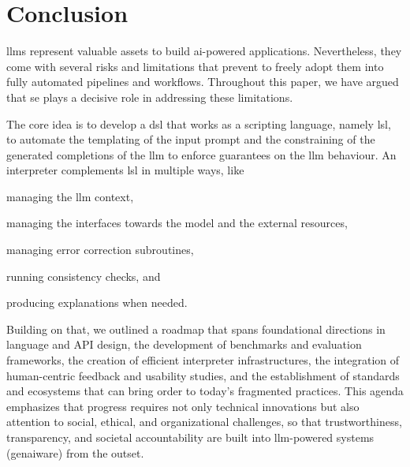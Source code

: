 \documentclass[manuscript,screen]{acmart}
\begin{document}
\section{Conclusion}
\label{sec:conclusion}

\acp{llm} represent valuable assets to build \ac{ai}-powered applications.
Nevertheless, they come with several risks and limitations that prevent to freely adopt them into fully automated pipelines and workflows.
Throughout this paper, we have argued that \ac{se} plays a decisive role in addressing these limitations.



The core idea is to develop a \ac{dsl} that works as a scripting language, namely \ac{lsl}, to automate the templating of the input prompt and the constraining of the generated completions of the \ac{llm} to enforce guarantees on the \ac{llm} behaviour.
An interpreter complements \ac{lsl} in multiple ways, like
\begin{enumerate*}
    \item managing the \ac{llm} context,
    \item managing the interfaces towards the model and the external resources,
    \item managing error correction subroutines,
    \item running consistency checks, and
    \item producing explanations when needed.
\end{enumerate*}

Building on that, we outlined a roadmap that spans foundational directions in language and API design, the development of benchmarks and evaluation frameworks, the creation of efficient interpreter infrastructures, the integration of human-centric feedback and usability studies, and the establishment of standards and ecosystems that can bring order to today’s fragmented practices. This agenda emphasizes that progress requires not only technical innovations but also attention to social, ethical, and organizational challenges, so that trustworthiness, transparency, and societal accountability are built into \ac{llm}-powered systems (\ac{genai}ware) from the outset.
\end{document}
